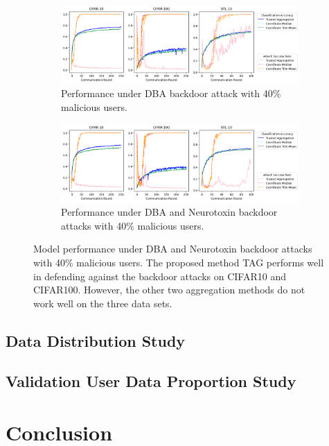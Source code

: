 \documentclass{article} %
\begin{document}
\begin{figure}[htp]
\centering
  \begin{subfigure}{\textwidth}
  \centering
    \includegraphics[height=3cm, width=.75\textwidth]{pics/accuracy--n_malicious4--dba1--beta0.2.png}
    \caption{\footnotesize Performance under DBA backdoor attack with 40\% malicious users.}
  \end{subfigure}%

  \begin{subfigure}{\textwidth}
  \centering
    \includegraphics[height=3cm, width=.75\textwidth]{pics/accuracy--n_malicious4--dba1--beta0.2--neuro_p0.1.png}
    \caption{\footnotesize Performance under DBA and Neurotoxin backdoor attacks with 40\% malicious users.}
  \end{subfigure}%
\caption{\footnotesize Model performance under DBA and Neurotoxin backdoor attacks with 40\% malicious users. The proposed method TAG performs well in defending against the backdoor attacks on CIFAR10 and CIFAR100. However, the other two aggregation methods do not work well on the three data sets.} 
\label{fig: accuracy--n_malicious4}
\end{figure}


%
\subsection{Data Distribution Study}


%
\subsection{Validation User Data Proportion Study}


% 
\section{Conclusion}
\end{document}
